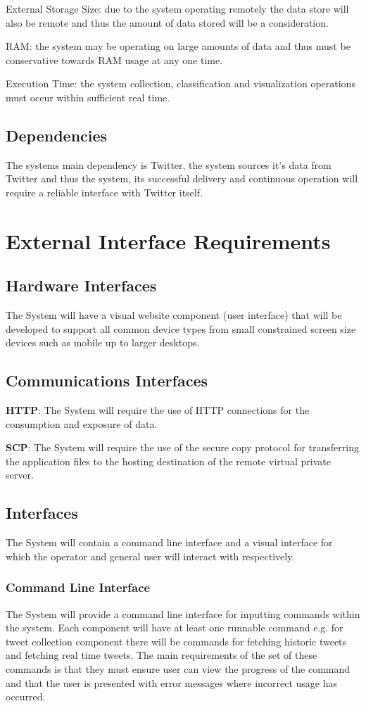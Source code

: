 \documentclass[11pt]{report}
\begin{document}
External Storage Size: due to the system operating remotely the data store will also be remote and thus the amount of data stored will be a consideration.

RAM: the system may be operating on large amounts of data and thus must be conservative towards RAM usage at any one time.

Execution Time: the system collection, classification and visualization operations must occur within sufficient real time.

\subsection*{Dependencies}
The systems main dependency is Twitter, the system sources it's data from Twitter and thus the system, its successful delivery and continuous operation will require a reliable interface with Twitter itself.

\section*{External Interface Requirements}
\subsection*{Hardware Interfaces}
The System will have a visual website component (user interface) that will be developed to support all common device types from small constrained screen size devices such as mobile up to larger desktops.

\subsection*{Communications Interfaces}
\textbf{HTTP}: The System will require the use of HTTP connections for the consumption and exposure of data.

\textbf{SCP}: The System will require the use of the secure copy protocol for transferring the application files to the hosting destination of the remote virtual private server.

\subsection*{Interfaces}
The System will contain a command line interface and a visual interface for which the operator and general user will interact with respectively.

\subsubsection*{Command Line Interface}
The System will provide a command line interface for inputting commands within the system. Each component will have at least one runnable command e.g. for tweet collection component there will be commands for fetching historic tweets and fetching real time tweets. The main requirements of the set of these commands is that they must ensure user can view the progress of the command and that the user is presented with error messages where incorrect usage has occurred.
\\
\end{document}

